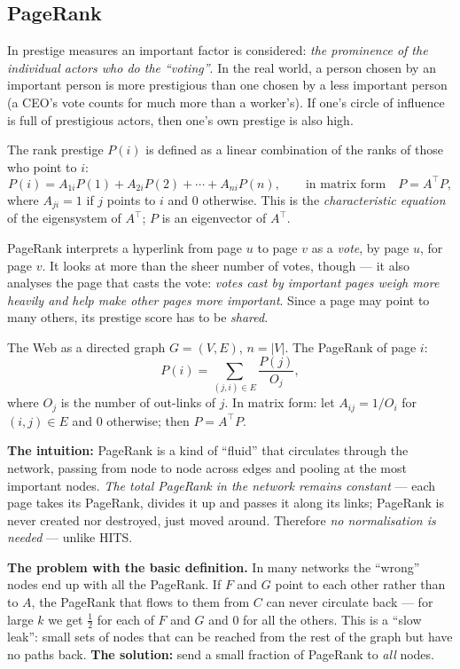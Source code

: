 \documentclass[11pt,a4paper]{article}
\theoremstyle{definition}
\providecommand{\uv}[1]{``#1''}
\begin{document}
\subsection{PageRank}
\label{ssec:pagerank}

\begin{defbox}
In prestige measures an important factor is considered: \emph{the prominence of the individual actors
who do the \uv{voting}}. In the real world, a person chosen by an important person is more prestigious
than one chosen by a less important person (a CEO's vote counts for much more than a worker's). If
one's circle of influence is full of prestigious actors, then one's own prestige is also high.

The rank prestige $P(i)$ is defined as a linear combination of the ranks of those who point to $i$:
\[ P(i)=A_{1i}P(1)+A_{2i}P(2)+\cdots+A_{ni}P(n),\qquad\text{in matrix form}\quad P=A^{\!\top}P, \]
where $A_{ji}=1$ if $j$ points to $i$ and 0 otherwise. This is the \emph{characteristic equation} of
the eigensystem of $A^{\!\top}$; $P$ is an eigenvector of $A^{\!\top}$.
\end{defbox}

\begin{defbox}
PageRank interprets a hyperlink from page $u$ to page $v$ as a \emph{vote}, by page $u$, for page $v$.
It looks at more than the sheer number of votes, though --- it also analyses the page that casts the
vote: \emph{votes cast by important pages weigh more heavily and help make other pages more
important}. Since a page may point to many others, its prestige score has to be \emph{shared}.

The Web as a directed graph $G=(V,E)$, $n=|V|$. The PageRank of page $i$:
\[ P(i)=\sum_{(j,i)\in E}\frac{P(j)}{O_j}, \]
where $O_j$ is the number of out-links of $j$. In matrix form: let $A_{ij}=1/O_i$ for $(i,j)\in E$ and
0 otherwise; then $P=A^{\!\top}P$.

\textbf{The intuition:} PageRank is a kind of \uv{fluid} that circulates through the network, passing
from node to node across edges and pooling at the most important nodes. \emph{The total PageRank in
the network remains constant} --- each page takes its PageRank, divides it up and passes it along its
links; PageRank is never created nor destroyed, just moved around. Therefore \emph{no normalisation is
needed} --- unlike HITS.
\end{defbox}

\textbf{The problem with the basic definition.} In many networks the \uv{wrong} nodes end up with all
the PageRank. If $F$ and $G$ point to each other rather than to $A$, the PageRank that flows to them
from $C$ can never circulate back --- for large $k$ we get $\frac12$ for each of $F$ and $G$ and 0 for
all the others. This is a \uv{slow leak}: small sets of nodes that can be reached from the rest of the
graph but have no paths back. \textbf{The solution:} send a small fraction of PageRank to \emph{all}
nodes.
\end{document}
